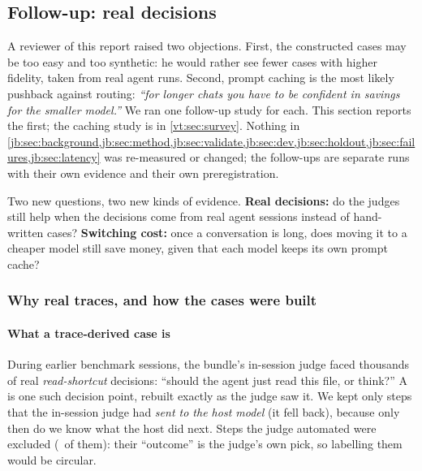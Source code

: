\subsection{Follow-up: real decisions}\label{jb:sec:followup}

A reviewer of this report raised two objections. First, the constructed cases may be too easy and too
synthetic: he would rather see fewer cases with higher fidelity, taken from real agent runs. Second, prompt
caching is the most likely pushback against routing: \emph{``for longer chats you have to be confident in
savings for the smaller model.''} We ran one follow-up study for each. This section reports the first; the caching study is in \cref{vt:sec:survey}. Nothing in
\cref{jb:sec:background,jb:sec:method,jb:sec:validate,jb:sec:dev,jb:sec:holdout,jb:sec:failures,jb:sec:latency} was
re-measured or changed; the follow-ups are separate runs with their own evidence and their own
preregistration.

\begin{keyidea}
Two new questions, two new kinds of evidence. \textbf{Real decisions:} do the judges still help when the
decisions come from real agent sessions instead of hand-written cases? \textbf{Switching cost:} once a
conversation is long, does moving it to a cheaper model still save money, given that each model keeps its
own prompt cache?
\end{keyidea}

\subsubsection{Why real traces, and how the cases were built}\label{jb:sec:traces}

\paragraph{What a trace-derived case is} During earlier benchmark sessions, the bundle's in-session judge
faced thousands of real \emph{read-shortcut} decisions: ``should the agent just read this file, or think?''
A  is one such decision point, rebuilt exactly as the judge saw it. We kept only
steps that the in-session judge had \emph{sent to the host model} (it fell back), because only then do we
know what the host did next. Steps the judge automated were excluded (\TrFastRouted\ of them): their
``outcome'' is the judge's own pick, so labelling them would be circular.

